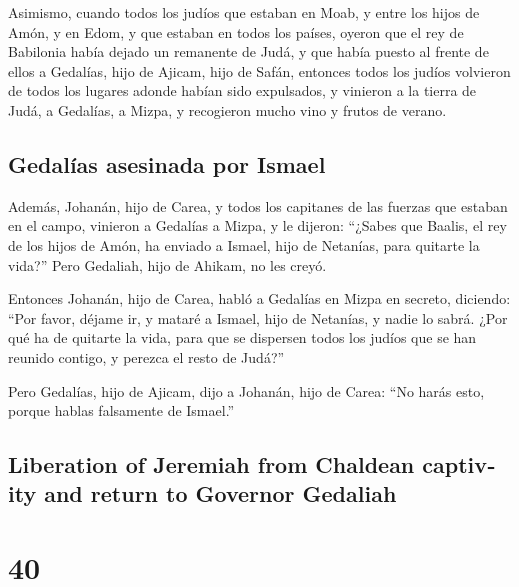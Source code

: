 \begin{paracol}{2}
 Asimismo, cuando todos los judíos que estaban en Moab, y
entre los hijos de Amón, y en Edom, y que estaban en todos los países,
oyeron que el rey de Babilonia había dejado un remanente de Judá, y que
había puesto al frente de ellos a Gedalías, hijo de Ajicam, hijo de
Safán,  entonces todos los judíos volvieron de todos los
lugares adonde habían sido expulsados, y vinieron a la tierra de Judá, a
Gedalías, a Mizpa, y recogieron mucho vino y frutos de verano.

\hypertarget{gedaluxedas-asesinada-por-ismael}{%
\subsection{Gedalías asesinada por
Ismael}\label{gedaluxedas-asesinada-por-ismael}}

 Además, Johanán, hijo de Carea, y todos los capitanes de
las fuerzas que estaban en el campo, vinieron a Gedalías a Mizpa,
 y le dijeron: ``¿Sabes que Baalis, el rey de los hijos
de Amón, ha enviado a Ismael, hijo de Netanías, para quitarte la vida?''
Pero Gedaliah, hijo de Ahikam, no les creyó.

 Entonces Johanán, hijo de Carea, habló a Gedalías en
Mizpa en secreto, diciendo: ``Por favor, déjame ir, y mataré a Ismael,
hijo de Netanías, y nadie lo sabrá. ¿Por qué ha de quitarte la vida,
para que se dispersen todos los judíos que se han reunido contigo, y
perezca el resto de Judá?''

 Pero Gedalías, hijo de Ajicam, dijo a Johanán, hijo de
Carea: ``No harás esto, porque hablas falsamente de Ismael.''

\switchcolumn
\begin{otherlanguage}{english}

\hypertarget{liberation-of-jeremiah-from-chaldean-captivity-and-return-to-governor-gedaliah}{%
\subsection{Liberation of Jeremiah from Chaldean captivity and return to
Governor
Gedaliah}\label{liberation-of-jeremiah-from-chaldean-captivity-and-return-to-governor-gedaliah}}

\hypertarget{section-79}{%
\section{40}\label{section-79}}


\end{otherlanguage}
\end{paracol}

